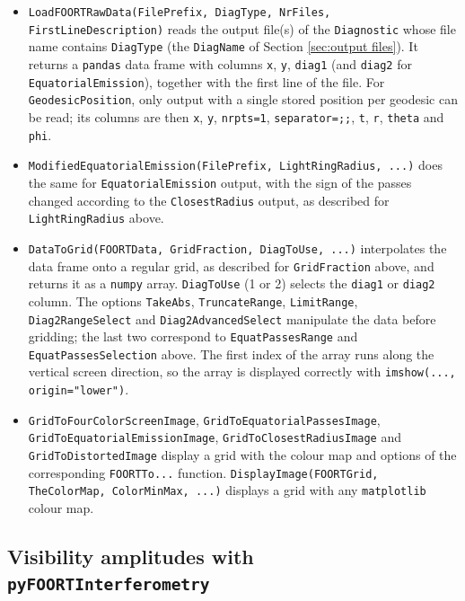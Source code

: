 \documentclass[11pt,a4paper]{article}
\newcommand{\code}[1]{{\tt #1}}
\begin{document}
\begin{itemize}
 \item \code{LoadFOORTRawData(FilePrefix, DiagType, NrFiles, FirstLineDescription)} reads the output file(s) of the \code{Diagnostic} whose file name contains \code{DiagType} (the \code{DiagName} of Section \ref{sec:output files}). It returns a \code{pandas} data frame with columns \code{x}, \code{y}, \code{diag1} (and \code{diag2} for \code{EquatorialEmission}), together with the first line of the file. For \code{GeodesicPosition}, only output with a single stored position per geodesic can be read; its columns are then \code{x}, \code{y}, \code{nrpts=1}, \code{separator=;;}, \code{t}, \code{r}, \code{theta} and \code{phi}.
 \item \code{ModifiedEquatorialEmission(FilePrefix, LightRingRadius, ...)} does the same for \code{EquatorialEmission} output, with the sign of the passes changed according to the \code{ClosestRadius} output, as described for \code{LightRingRadius} above.
 \item \code{DataToGrid(FOORTData, GridFraction, DiagToUse, ...)} interpolates the data frame onto a regular grid, as described for \code{GridFraction} above, and returns it as a \code{numpy} array. \code{DiagToUse} (1 or 2) selects the \code{diag1} or \code{diag2} column. The options \code{TakeAbs}, \code{TruncateRange}, \code{LimitRange}, \code{Diag2RangeSelect} and \code{Diag2AdvancedSelect} manipulate the data before gridding; the last two correspond to \code{EquatPassesRange} and \code{EquatPassesSelection} above. The first index of the array runs along the vertical screen direction, so the array is displayed correctly with \code{imshow(..., origin="lower")}.
 \item \code{GridToFourColorScreenImage}, \code{GridToEquatorialPassesImage}, \\\code{GridToEquatorialEmissionImage}, \code{GridToClosestRadiusImage} and \code{GridToDistortedImage} display a grid with the colour map and options of the corresponding \code{FOORTTo...} function. \code{DisplayImage(FOORTGrid, TheColorMap, ColorMinMax, ...)} displays a grid with any \code{matplotlib} colour map.
\end{itemize}

\subsection{Visibility amplitudes with \code{pyFOORTInterferometry}}\label{sec:pyFOORTInterferometry}
\end{document}
